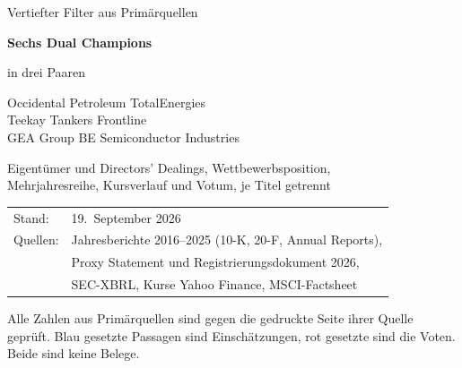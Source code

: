 \begin{titlepage}
\centering
{}
{\large Vertiefter Filter aus Prim\"arquellen\par}
\vspace{1.2cm}
{\Huge\bfseries Sechs Dual Champions\par}
\vspace{0.4cm}
{\LARGE in drei Paaren\par}
\vspace{0.8cm}
{\Large Occidental Petroleum \quad\textbar\quad TotalEnergies\\[2pt]
Teekay Tankers \quad\textbar\quad Frontline\\[2pt]
GEA Group \quad\textbar\quad BE Semiconductor Industries\par}
{\large Eigent\"umer und Directors' Dealings, Wettbewerbsposition,\\
Mehrjahresreihe, Kursverlauf und Votum, je Titel getrennt\par}
\begin{tabular}{ll}
Stand:   & 19.~September 2026\\
Quellen: & Jahresberichte 2016--2025 (10-K, 20-F, Annual Reports),\\
         & Proxy Statement und Registrierungsdokument 2026,\\
         & SEC-XBRL, Kurse Yahoo Finance, MSCI-Factsheet\\
\end{tabular}
\par
\vspace{1.2cm}
\begin{minipage}{0.8\linewidth}
\centering\small
Alle Zahlen aus Prim\"arquellen sind gegen die gedruckte Seite ihrer Quelle
gepr\"uft. Blau gesetzte Passagen sind Einsch\"atzungen, rot gesetzte sind die
Voten. Beide sind keine Belege.
\end{minipage}
\end{titlepage}

